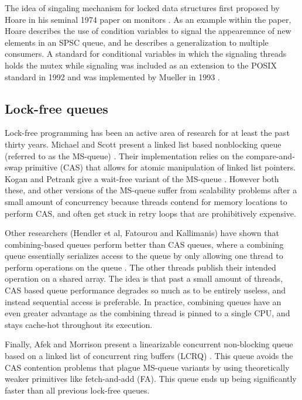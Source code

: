 \documentclass[twoside,10pt]{article}
\begin{document}
\begin{multicols}{2}
The idea of singaling mechanism for locked data structures first
proposed by Hoare in his seminal 1974 paper on monitors
\cite{hoare1974monitors}. As an example within the paper, Hoare
describes the use of condition variables to signal the appearemnce of
new elements in an SPSC queue, and he describes a generalization to
multiple consumers. A standard for conditional variables in which the
signaling threads holds the mutex while signaling was included as an
extension to the POSIX standard in 1992 and was implemented by Mueller
in 1993 \cite{ieee1992pthreads,mueller1993library}.

\subsection{Lock-free queues}

Lock-free programming has been an active area of research for at least
the past thirty years. Michael and Scott present a linked list based
nonblocking queue (referred to as the MS-queue) \cite{MS96}. Their
implementation relies on the compare-and-swap primitive (CAS) that
allows for atomic manipulation of linked list pointers. Kogan and
Petrank give a wait-free variant of the MS-queue \cite{KP11}. However
both these, and other versions of the MS-queue suffer from scalability
problems after a small amount of concurrency because threads contend
for memory locations to perform CAS, and often get stuck in retry
loops that are prohibitively expensive.

Other researchers (Hendler et al, Fatourou and Kallimanis) have shown
that combining-based queues perform better than CAS queues, where a
combining queue essentially serializes access to the queue by only
allowing one thread to perform operations on the queue \cite{He10,
  FK12}. The other threads publish their intended operation on a
shared array. The idea is that past a small amount of threads, CAS
based queue performance degrades so much as to be entirely useless,
and instead sequential access is preferable. In practice, combining
queues have an even greater advantage as the combining thread is
pinned to a single CPU, and stays cache-hot throughout its execution.

Finally, Afek and Morrison present a linearizable concurrent
non-blocking queue based on a linked list of concurrent ring buffers
(LCRQ) \cite{AM13}. This queue avoids the CAS contention problems that
plague MS-queue variants by using theoretically weaker primitives like
fetch-and-add (FA). This queue ends up being significantly faster than
all previous lock-free queues.


\end{multicols}
\end{document}
